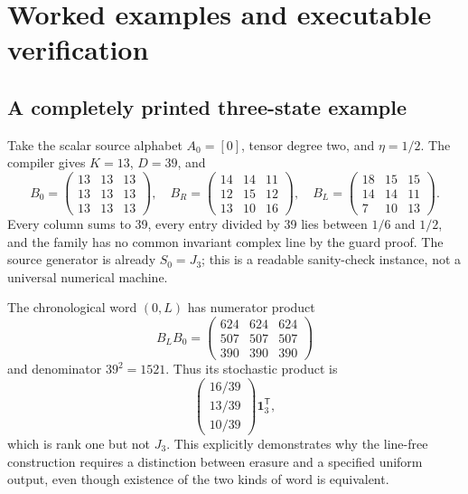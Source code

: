 \documentclass[11pt,letterpaper]{article}
\theoremstyle{definition}
\theoremstyle{remark}
\newcommand{\one}{\mathbf 1}
\newcommand{\transpose}{^{\mathsf T}}
\begin{document}
\section{Worked examples and executable verification}
\label{ste:ee:sec:examples}

\subsection{A completely printed three-state example}

Take the scalar source alphabet $A_0=[0]$, tensor degree two, and $\eta=1/2$.
The compiler gives $K=13$, $D=39$, and
\begin{equation}
 B_0=\begin{pmatrix}13&13&13\\13&13&13\\13&13&13\end{pmatrix},\quad
 B_R=\begin{pmatrix}14&14&11\\12&15&12\\13&10&16\end{pmatrix},\quad
 B_L=\begin{pmatrix}18&15&15\\14&14&11\\7&10&13\end{pmatrix}.
 \label{ste:ee:eq:tiny}
\end{equation}
Every column sums to 39, every entry divided by 39 lies between $1/6$ and $1/2$,
and the family has no common invariant complex line by the guard proof.
The source generator is already $S_0=J_3$; this is a readable sanity-check
instance, not a universal numerical machine.

The chronological word $(0,L)$ has numerator product
\[
 B_LB_0=
 \begin{pmatrix}624&624&624\\507&507&507\\390&390&390\end{pmatrix}
\]
and denominator $39^2=1521$. Thus its stochastic product is
\[
 \begin{pmatrix}16/39\\13/39\\10/39\end{pmatrix}\one_3\transpose,
\]
which is rank one but not $J_3$. This explicitly demonstrates why the line-free
construction requires a distinction between erasure and a specified uniform
output, even though existence of the two kinds of word is equivalent.
\end{document}

